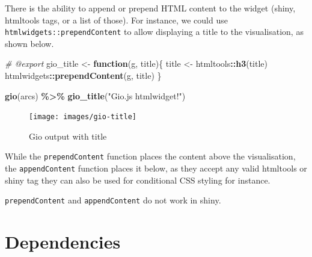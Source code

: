 \documentclass[
  10pt,
]{krantz}
\makeatletter
\newenvironment{Shaded}{\begin{snugshade}}{\end{snugshade}}
\newcommand{\CommentTok}[1]{\textcolor[rgb]{0.37,0.37,0.37}{\textit{#1}}}
\newcommand{\ControlFlowTok}[1]{\textcolor[rgb]{0.27,0.27,0.27}{\textbf{#1}}}
\newcommand{\KeywordTok}[1]{\textcolor[rgb]{0.27,0.27,0.27}{\textbf{#1}}}
\newcommand{\NormalTok}[1]{#1}
\newcommand{\OperatorTok}[1]{\textcolor[rgb]{0.43,0.43,0.43}{\textbf{#1}}}
\newcommand{\StringTok}[1]{\textcolor[rgb]{0.5,0.5,0.5}{#1}}
\newenvironment{kframe}{%
\medskip{}
\setlength{\fboxsep}{.8em}
 \def\at@end@of@kframe{}%
 \ifinner\ifhmode%
  \def\at@end@of@kframe{\end{minipage}}%
  \begin{minipage}{\columnwidth}%
 \fi\fi%
 \def\FrameCommand##1{\hskip\@totalleftmargin \hskip-\fboxsep
 \colorbox{shadecolor}{##1}\hskip-\fboxsep
     \hskip-\linewidth \hskip-\@totalleftmargin \hskip\columnwidth}%
 \MakeFramed {\advance\hsize-\width
   \@totalleftmargin\z@ \linewidth\hsize
   \@setminipage}}%
 {\par\unskip\endMakeFramed%
 \at@end@of@kframe}
\renewenvironment{Shaded}{\begin{kframe}}{\end{kframe}}
\newenvironment{rmdblock}[1]
  {
  \begin{itemize}
  \renewcommand{\labelitemi}{
    \raisebox{-.7\height}[0pt][0pt]{
      {\setkeys{Gin}{width=3em,keepaspectratio}\texttt{[image: images/\#1]}}
    }
  }
  \setlength{\fboxsep}{1em}
  \begin{kframe}
  \item
  }
  {
  \end{kframe}
  \end{itemize}
  }
\newenvironment{rmdnote}
  {\begin{rmdblock}{note}}
  {\end{rmdblock}}
\makeatother
\begin{document}
There is the ability to append or prepend HTML content to the widget (shiny, htmltools tags, or a list of those). For instance, we could use \texttt{htmlwidgets::prependContent} to allow displaying a title to the visualisation, as shown below.

\begin{Shaded}
\begin{Highlighting}[]
\CommentTok{\#\textquotesingle{} @export}
\NormalTok{gio\_title <{-}}\StringTok{ }\ControlFlowTok{function}\NormalTok{(g, title)\{}
\NormalTok{  title <{-}}\StringTok{ }\NormalTok{htmltools}\OperatorTok{::}\KeywordTok{h3}\NormalTok{(title)}
\NormalTok{  htmlwidgets}\OperatorTok{::}\KeywordTok{prependContent}\NormalTok{(g, title)}
\NormalTok{\}}
\end{Highlighting}
\end{Shaded}

\begin{Shaded}
\begin{Highlighting}[]
\KeywordTok{gio}\NormalTok{(arcs) }\OperatorTok{\%>\%}\StringTok{ }
\StringTok{  }\KeywordTok{gio\_title}\NormalTok{(}\StringTok{"Gio.js htmlwidget!"}\NormalTok{)}
\end{Highlighting}
\end{Shaded}

\begin{figure}[H]

{\centering \texttt{[image: images/gio-title]} 

}

\caption{Gio output with title}\label{fig:gio-title}
\end{figure}

While the \texttt{prependContent} function places the content above the visualisation, the \texttt{appendContent} function places it below, as they accept any valid htmltools or shiny tag they can also be used for conditional CSS styling for instance.

\begin{rmdnote}
\texttt{prependContent} and \texttt{appendContent} do not work in shiny.
\end{rmdnote}

\hypertarget{widgets-adv-dependencies}{%
\section{Dependencies}\label{widgets-adv-dependencies}}
\end{document}
